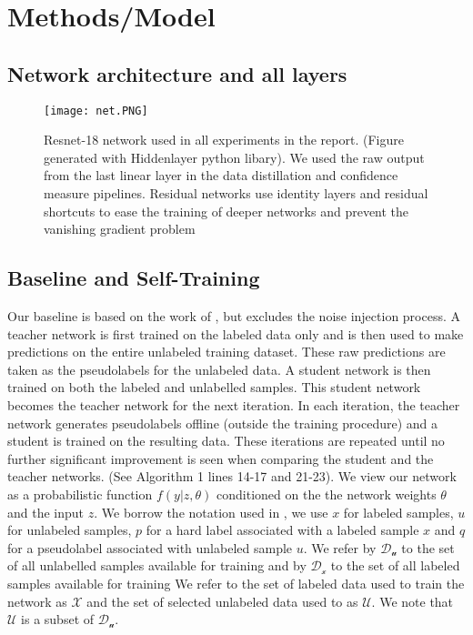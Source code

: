 \documentclass{article}
\begin{document}
\section{Methods/Model}
\subsection{Network architecture and all layers}
\begin{figure}[h]
    \centering
    \texttt{[image: net.PNG]}
    \caption{Resnet-18 network used in all experiments in the report. (Figure generated with Hiddenlayer python libary). We used the raw output from the last linear layer in the data distillation and confidence measure pipelines. Residual networks use identity layers and residual shortcuts to ease the training of deeper networks and prevent the vanishing gradient problem} 
    \label{resnet}
\end{figure}
\subsection{Baseline and Self-Training}
Our baseline is based on the work of  \cite{xie2019selftraining}, but excludes the noise injection process. A teacher network is first trained on the labeled data only and is then used to make predictions on the entire unlabeled training dataset. These raw predictions are taken as the pseudolabels for the unlabeled data. A student network is then trained on both the labeled and unlabelled samples. This student network becomes the teacher network for the next iteration. In each iteration, the teacher network generates pseudolabels offline (outside the training procedure) and a student is trained on the resulting data. These iterations are repeated until no further significant improvement is seen when comparing the student and the teacher networks. (See Algorithm 1 lines 14-17 and 21-23).
\newline 
We view our network as a probabilistic function $f(y | z, \theta)$ conditioned on the the network weights $\theta$ and the input $z$. We borrow the notation used in \cite{Berthelot2019MixMatch:Learning}, we use $x$ for labeled samples, $u$ for unlabeled samples, $p$ for a hard label associated with a labeled sample $x$ and $q$ for a pseudolabel associated with unlabeled sample $u$. We refer by $\mathcal{D_{u}}$ to the set of all unlabelled samples available for training and by $\mathcal{D_{x}}$ to the set of all labeled samples available for training We refer to the set of labeled data used to train the network as $\mathcal{X}$ and the set of selected unlabeled data used to as $\mathcal{U}$. We note that $\mathcal{U}$ is a subset of $\mathcal{D_{u}}$.
\end{document}
